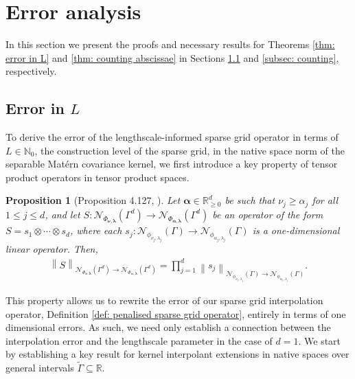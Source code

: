 \documentclass[pdflatex,sn-mathphys-num]{sn-jnl}%
\theoremstyle{thmstyleone}%
\newtheorem{proposition}{Proposition}%
\theoremstyle{thmstyletwo}%
\theoremstyle{thmstylethree}%
\begin{document}
\section{Error analysis}\label{sec: error analysis}
In this section we present the proofs and necessary results for Theorems \ref{thm: error in L} and \ref{thm: counting abscissae} in Sections \ref{subsec: error in L} and \ref{subsec: counting}, respectively.

\subsection{Error in \(L\)}\label{subsec: error in L}
To derive the error of the lengthscale-informed sparse grid operator in terms of \(L\in\mathbb{N}_0\), the construction level of the sparse grid, in the native space norm of the separable Mat\'ern covariance kernel, we first introduce a key property of tensor product operators in tensor product spaces.

\begin{proposition}[Proposition 4.127, \cite{Hackbush2012}]\label{prop: tensor product norm}
    Let \(\boldsymbol{\alpha}\in\mathbb{R}^d_{\geq0}\) be such that \(\nu_j\geq\alpha_j\) for all \(1\leq j\leq d\), and let \(S:\mathcal{N}_{\Phi_{\boldsymbol{\nu},\boldsymbol{\lambda}}}(\Gamma^d)\rightarrow\mathcal{N}_{\Phi_{\boldsymbol{\alpha},\boldsymbol{\lambda}}}(\Gamma^d)\) be an operator of the form \(S=s_1\otimes\cdots\otimes s_d\), where each \(s_j:\mathcal{N}_{\phi_{\nu_j,\lambda_j}}\left(\Gamma\right)\rightarrow\mathcal{N}_{\phi_{\alpha_j,\lambda_j}}\left(\Gamma\right)\) is a one-dimensional linear operator. Then,
    \begin{align}
        \left\|S\right\|_{\mathcal{N}_{\Phi_{\boldsymbol{\nu},\boldsymbol{\lambda}}}(\Gamma^d)\rightarrow\mathcal{N}_{\Phi_{\boldsymbol{\alpha},\boldsymbol{\lambda}}}(\Gamma^d)}=\prod_{j=1}^d\left\|s_j\right\|_{\mathcal{N}_{\phi_{\nu_j,\lambda_j}}\left(\Gamma\right)\rightarrow\mathcal{N}_{\phi_{\alpha_j,\lambda_j}}\left(\Gamma\right)}.\label{eq: tensor product structure}
    \end{align}
\end{proposition}
This property allows us to rewrite the error of our sparse grid interpolation operator, Definition \ref{def: penalised sparse grid operator}, entirely in terms of one dimensional errors. As such, we need only establish a connection between the interpolation error and the lengthscale parameter in the case of \(d=1\). We start by establishing a key result for kernel interpolant extensions in native spaces over general intervals \(\tilde{\Gamma}\subseteq \mathbb{R}\).
\end{document}

